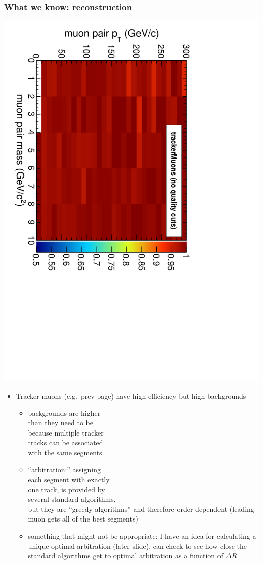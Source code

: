 \documentclass[compress]{beamer}
\begin{document}
\begin{frame}
\frametitle{What we know: reconstruction}

\vspace{1 cm}
\hfill \includegraphics[height=0.5\linewidth, angle=90]{efficiency2d_tracker.pdf}

\vspace{-5 cm}
\begin{itemize}
\item Tracker muons (e.g.\ prev page) have high efficiency but high backgrounds
\begin{itemize}
\item backgrounds are higher \\ than they need to be \\ because multiple
  tracker \\ tracks can be associated \\ with the same segments
\item ``arbitration:'' assigning \\ each segment with exactly \\ one track,
  is provided by \\ several standard algorithms, \\ but they are ``greedy
  algorithms'' and therefore order-dependent (leading muon gets all of
  the best segments)
\item something that might not be appropriate: I have an idea for calculating a
  unique optimal arbitration (later slide), can check to see how close the standard
  algorithms get to optimal arbitration as a function of $\Delta R$
\end{itemize}
\end{itemize}
\end{frame}
\end{document}
